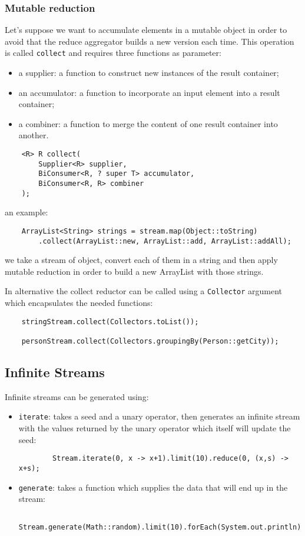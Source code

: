 \subsubsection{Mutable reduction}
Let's suppose we want to accumulate elements in a mutable object in order to avoid that the reduce aggregator builds a new version each time.
This operation is called \verb|collect| and requires three functions as parameter:
\begin{itemize}
    \item a supplier: a function to construct new instances of the result container;
    \item an accumulator: a function to incorporate an input element into a result container;
    \item a combiner: a function to merge the content of one result container into another.
\end{itemize}
\begin{verbatim}
    <R> R collect(
        Supplier<R> supplier,
        BiConsumer<R, ? super T> accumulator,
        BiConsumer<R, R> combiner
    );
\end{verbatim}
an example:
\begin{verbatim}
    ArrayList<String> strings = stream.map(Object::toString)
        .collect(ArrayList::new, ArrayList::add, ArrayList::addAll);
\end{verbatim}
we take a stream of object, convert each of them in a string and then apply mutable reduction in order to build a new ArrayList with those strings.

In alternative the collect reductor can be called using a \verb|Collector| argument which encapsulates the needed functions:
\begin{verbatim}
    stringStream.collect(Collectors.toList());

    personStream.collect(Collectors.groupingBy(Person::getCity));
\end{verbatim}

\subsection{Infinite Streams}
Infinite streams can be generated using:
\begin{itemize}
    \item \verb|iterate|: takes a seed and a unary operator, then generates an infinite stream with the values returned by the unary operator which itself will update the seed:
    \begin{verbatim}
        Stream.iterate(0, x -> x+1).limit(10).reduce(0, (x,s) -> x+s);
    \end{verbatim}

    \item \verb|generate|: takes a function which supplies the data that will end up in the stream:
    \begin{verbatim}
        Stream.generate(Math::random).limit(10).forEach(System.out.println);
    \end{verbatim}
\end{itemize}

